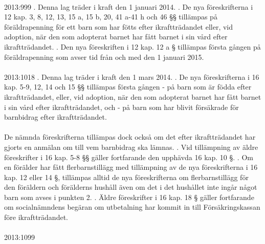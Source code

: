\documentclass[a4paper,notitlepage,openany,10pt]{book}
\begin{document}
\paragraph*{}
2013:999
. Denna lag träder i kraft den 1 januari 2014.
. De nya föreskrifterna i 12 kap. 3, 8, 12, 13, 15 a, 15 b, 20, 41 a-41 h och 46 §§ tillämpas på föräldrapenning för ett barn som har fötts efter ikraftträdandet eller, vid adoption, när den som adopterat barnet har fått barnet i sin vård efter ikraftträdandet.
. Den nya föreskriften i 12 kap. 12 a § tillämpas första gången på föräldrapenning som avser tid från och med den 1 januari 2015.
\paragraph*{}
2013:1018
. Denna lag träder i kraft den 1 mars 2014.
. De nya föreskrifterna i 16 kap. 5-9, 12, 14 och 15 §§ tillämpas första gången
\newline - på barn som är födda efter ikraftträdandet, eller, vid adoption, när den som adopterat barnet har fått barnet i sin vård efter ikraftträdandet, och
\newline - på barn som har blivit försäkrade för barnbidrag efter ikraftträdandet.
\paragraph*{}
De nämnda föreskrifterna tillämpas dock också om det efter ikraftträdandet har gjorts en anmälan om till vem barnbidrag ska lämnas.
. Vid tillämpning av äldre föreskrifter i 16 kap. 5-8 §§ gäller fortfarande den upphävda 16 kap. 10 §.
. Om en förälder har fått flerbarnstillägg med tillämpning av de nya föreskrifterna i 16 kap. 12 eller 14 §, tillämpas alltid de nya föreskrifterna om flerbarnstillägg för den föräldern och förälderns hushåll även om det i det hushållet inte ingår något barn som avses i punkten 2.
. Äldre föreskrifter i 16 kap. 18 § gäller fortfarande om socialnämndens begäran om utbetalning har kommit in till Försäkringskassan före ikraftträdandet.
\paragraph*{}
2013:1099
\end{document}
